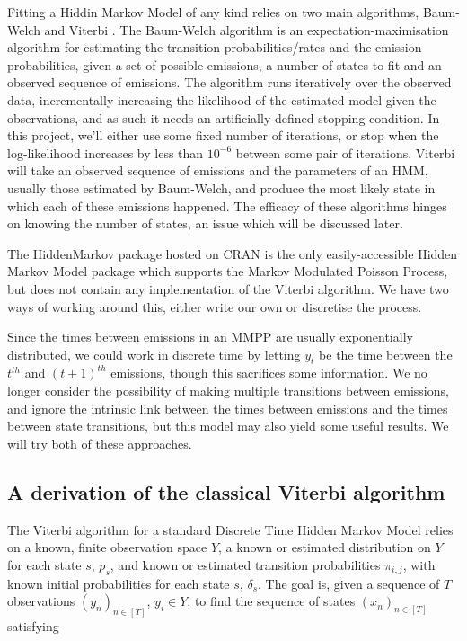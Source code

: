 Fitting a Hiddin Markov Model of any kind relies on two main algorithms, Baum-Welch \cite{baumwelch} and Viterbi \cite{viterbi}. The Baum-Welch algorithm is an expectation-maximisation algorithm for estimating the transition probabilities/rates and the emission probabilities, given a set of possible emissions, a number of states to fit and an observed sequence of emissions. The algorithm runs iteratively over the observed data, incrementally increasing the likelihood of the estimated model given the observations, and as such it needs an artificially defined stopping condition. In this project, we'll either use some fixed number of iterations, or stop when the log-likelihood increases by less than $10^{-6}$ between some pair of iterations. Viterbi will take an observed sequence of emissions and the parameters of an HMM, usually those estimated by Baum-Welch, and produce the most likely state in which each of these emissions happened. The efficacy of these algorithms hinges on knowing the number of states, an issue which will be discussed later.

The HiddenMarkov package hosted on CRAN \cite{hiddenmarkov} is the only easily-accessible Hidden Markov Model package which supports the Markov Modulated Poisson Process, but does not contain any implementation of the Viterbi algorithm. We have two ways of working around this, either write our own or discretise the process.

Since the times between emissions in an MMPP are usually exponentially distributed, we could work in discrete time by letting $y_t$ be the time between the $t^{th}$ and $(t+1)^{th}$ emissions, though this sacrifices some information. We no longer consider the possibility of making multiple transitions between emissions, and ignore the intrinsic link between the times between emissions and the times between state transitions, but this model may also yield some useful results. We will try both of these approaches.

\subsection{A derivation of the classical Viterbi algorithm}

The Viterbi algorithm for a standard Discrete Time Hidden Markov Model relies on a known, finite observation space $Y$, a known or estimated distribution on $Y$ for each state $s$, $p_s$, and known or estimated transition probabilities $\pi_{i,j}$, with known initial probabilities for each state $s$, $\delta_s$. The goal is, given a sequence of $T$ observations $(y_n)_{n \in [T]}$, $y_i \in Y$, to find the sequence of states $(x_n)_{n \in [T]}$ satisfying

